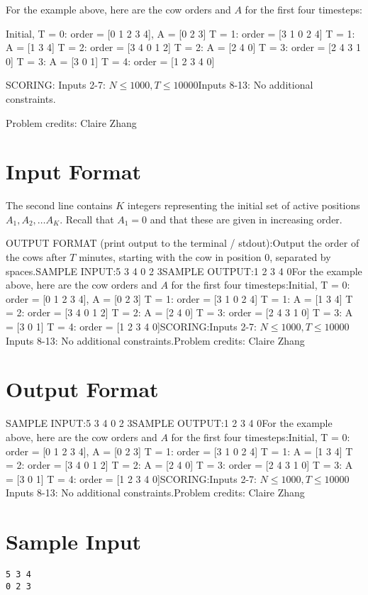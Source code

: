 \documentclass[12pt]{article}
\begin{document}
For the example above, here are the cow orders and $A$ for the first four
timesteps:


Initial, T = 0: order = [0 1 2 3 4], A = [0 2 3]
T = 1: order = [3 1 0 2 4]
T = 1: A = [1 3 4]
T = 2: order = [3 4 0 1 2]
T = 2: A = [2 4 0]
T = 3: order = [2 4 3 1 0]
T = 3: A = [3 0 1]
T = 4: order = [1 2 3 4 0]

SCORING:
Inputs 2-7: $N \leq 1000, T \leq 10000$Inputs 8-13: No additional constraints.


Problem credits: Claire Zhang



\section*{Input Format}
The second line contains $K$ integers representing the initial set of active positions
$A_1,A_2, \ldots A_K$.  Recall that $A_1 = 0$ and that these are given in increasing order.

OUTPUT FORMAT (print output to the terminal / stdout):Output the order of the cows after $T$ minutes, starting with the cow in position $0$, separated by
spaces.SAMPLE INPUT:5 3 4
0 2 3SAMPLE OUTPUT:1 2 3 4 0For the example above, here are the cow orders and $A$ for the first four
timesteps:Initial, T = 0: order = [0 1 2 3 4], A = [0 2 3]
T = 1: order = [3 1 0 2 4]
T = 1: A = [1 3 4]
T = 2: order = [3 4 0 1 2]
T = 2: A = [2 4 0]
T = 3: order = [2 4 3 1 0]
T = 3: A = [3 0 1]
T = 4: order = [1 2 3 4 0]SCORING:Inputs 2-7: $N \leq 1000, T \leq 10000$Inputs 8-13: No additional constraints.Problem credits: Claire Zhang

\section*{Output Format}
SAMPLE INPUT:5 3 4
0 2 3SAMPLE OUTPUT:1 2 3 4 0For the example above, here are the cow orders and $A$ for the first four
timesteps:Initial, T = 0: order = [0 1 2 3 4], A = [0 2 3]
T = 1: order = [3 1 0 2 4]
T = 1: A = [1 3 4]
T = 2: order = [3 4 0 1 2]
T = 2: A = [2 4 0]
T = 3: order = [2 4 3 1 0]
T = 3: A = [3 0 1]
T = 4: order = [1 2 3 4 0]SCORING:Inputs 2-7: $N \leq 1000, T \leq 10000$Inputs 8-13: No additional constraints.Problem credits: Claire Zhang

\section*{Sample Input}
\begin{verbatim}
5 3 4
0 2 3
\end{verbatim}
\end{document}
